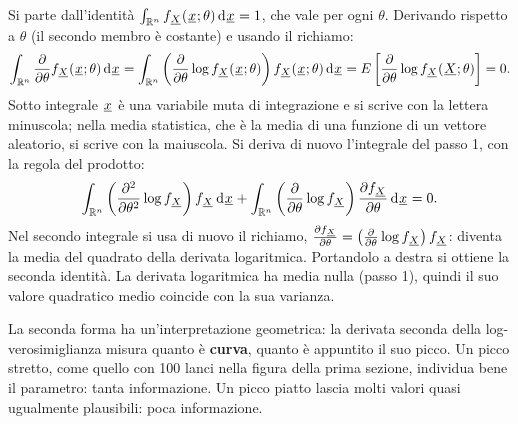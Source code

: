 \begin{dimostrazione}
 Si parte dall'identità $\int_{\mathbb{R}^n} f_{{\mkern1mu\underline{X}\mkern1mu}}({\mkern1mu\underline{x}\mkern1mu}; \theta) \,\mathrm{d}{\mkern1mu\underline{x}\mkern1mu} = 1$, che vale
per ogni $\theta$. Derivando rispetto a $\theta$ (il secondo membro è costante) e usando il richiamo:
\[ \int_{\mathbb{R}^n} \frac{\partial}{\partial\theta} f_{{\mkern1mu\underline{X}\mkern1mu}}({\mkern1mu\underline{x}\mkern1mu}; \theta) \,\mathrm{d}{\mkern1mu\underline{x}\mkern1mu} = \int_{\mathbb{R}^n} \left(
   \frac{\partial}{\partial\theta} \log f_{{\mkern1mu\underline{X}\mkern1mu}}({\mkern1mu\underline{x}\mkern1mu}; \theta) \right) f_{{\mkern1mu\underline{X}\mkern1mu}}({\mkern1mu\underline{x}\mkern1mu}; \theta)
   \,\mathrm{d}{\mkern1mu\underline{x}\mkern1mu} = E\left[ \frac{\partial}{\partial\theta} \log f_{{\mkern1mu\underline{X}\mkern1mu}}({\mkern1mu\underline{X}\mkern1mu}; \theta) \right] = 0 . \]
Sotto integrale ${\mkern1mu\underline{x}\mkern1mu}$ è una variabile muta di integrazione e si scrive con la lettera minuscola; nella media
statistica, che è la media di una funzione di un vettore aleatorio, si scrive con la maiuscola.
 Si deriva di nuovo l'integrale del passo 1, con la regola del prodotto:
\[ \int_{\mathbb{R}^n} \left( \frac{\partial^2}{\partial\theta^2} \log f_{{\mkern1mu\underline{X}\mkern1mu}} \right) f_{{\mkern1mu\underline{X}\mkern1mu}} \,\mathrm{d}{\mkern1mu\underline{x}\mkern1mu} +
   \int_{\mathbb{R}^n} \left( \frac{\partial}{\partial\theta} \log f_{{\mkern1mu\underline{X}\mkern1mu}} \right) \frac{\partial f_{{\mkern1mu\underline{X}\mkern1mu}}}{\partial
   \theta} \,\mathrm{d}{\mkern1mu\underline{x}\mkern1mu} = 0 . \]
Nel secondo integrale si usa di nuovo il richiamo, $\frac{\partial f_{{\mkern1mu\underline{X}\mkern1mu}}}{\partial\theta} = \left(
\frac{\partial}{\partial\theta} \log f_{{\mkern1mu\underline{X}\mkern1mu}} \right) f_{{\mkern1mu\underline{X}\mkern1mu}}$: diventa la media del quadrato della derivata
logaritmica. Portandolo a destra si ottiene la seconda identità.
 La derivata logaritmica ha media nulla (passo 1), quindi il suo valore quadratico medio
coincide con la sua varianza.
\end{dimostrazione}


La seconda forma ha un'interpretazione geometrica: la derivata seconda della log-verosimiglianza misura quanto è
\textbf{curva}, quanto è appuntito il suo picco. Un picco stretto, come quello con 100 lanci nella figura della prima
sezione, individua bene il parametro: tanta informazione. Un picco piatto lascia molti valori quasi ugualmente
plausibili: poca informazione.


